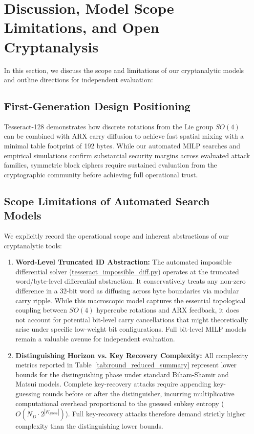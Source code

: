 \documentclass[10pt,twocolumn]{article}
\begin{document}
\section{Discussion, Model Scope Limitations, and Open Cryptanalysis}
\label{sec:discussion}

In this section, we discuss the scope and limitations of our cryptanalytic models and outline directions for independent evaluation:

\subsection{First-Generation Design Positioning}
Tesseract-128 demonstrates how discrete rotations from the Lie group $SO(4)$ can be combined with ARX carry diffusion to achieve fast spatial mixing with a minimal table footprint of 192 bytes. While our automated MILP searches and empirical simulations confirm substantial security margins across evaluated attack families, symmetric block ciphers require sustained evaluation from the cryptographic community before achieving full operational trust.

\subsection{Scope Limitations of Automated Search Models}
We explicitly record the operational scope and inherent abstractions of our cryptanalytic tools:
\begin{enumerate}
    \item \textbf{Word-Level Truncated ID Abstraction:} The automated impossible differential solver (\url{tesseract_impossible_diff.py}) operates at the truncated word/byte-level differential abstraction. It conservatively treats any non-zero difference in a 32-bit word as diffusing across byte boundaries via modular carry ripple. While this macroscopic model captures the essential topological coupling between $SO(4)$ hypercube rotations and ARX feedback, it does not account for potential bit-level carry cancellations that might theoretically arise under specific low-weight bit configurations. Full bit-level MILP models remain a valuable avenue for independent evaluation.
    \item \textbf{Distinguishing Horizon vs. Key Recovery Complexity:} All complexity metrics reported in Table~\ref{tab:round_reduced_summary} represent lower bounds for the distinguishing phase under standard Biham-Shamir and Matsui models. Complete key-recovery attacks require appending key-guessing rounds before or after the distinguisher, incurring multiplicative computational overhead proportional to the guessed subkey entropy ($O(N_D \cdot 2^{|K_{\text{guess}}|})$). Full key-recovery attacks therefore demand strictly higher complexity than the distinguishing lower bounds.
\end{enumerate}
\end{document}

